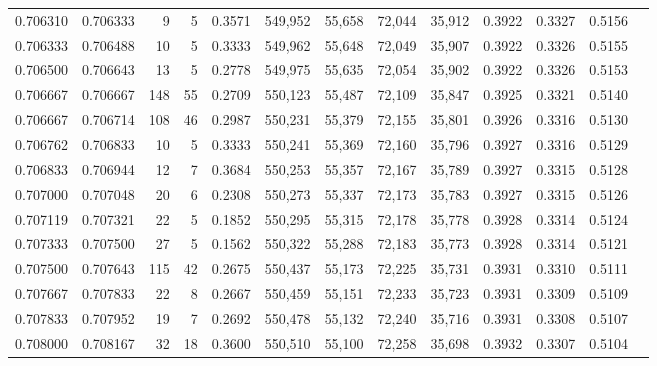 \begin{tabular}{rrrrrrrrrrrrr}
0.706310 & 0.706333 &     9 &   5 &                                     0.3571 & 549,952 &  55,658 &  72,044 &  35,912 & 0.3922 & 0.3327 & 0.5156 \\
0.706333 & 0.706488 &    10 &   5 &                                     0.3333 & 549,962 &  55,648 &  72,049 &  35,907 & 0.3922 & 0.3326 & 0.5155 \\
0.706500 & 0.706643 &    13 &   5 &                                     0.2778 & 549,975 &  55,635 &  72,054 &  35,902 & 0.3922 & 0.3326 & 0.5153 \\
0.706667 & 0.706667 &   148 &  55 &                                     0.2709 & 550,123 &  55,487 &  72,109 &  35,847 & 0.3925 & 0.3321 & 0.5140 \\
0.706667 & 0.706714 &   108 &  46 &                                     0.2987 & 550,231 &  55,379 &  72,155 &  35,801 & 0.3926 & 0.3316 & 0.5130 \\
0.706762 & 0.706833 &    10 &   5 &                                     0.3333 & 550,241 &  55,369 &  72,160 &  35,796 & 0.3927 & 0.3316 & 0.5129 \\
0.706833 & 0.706944 &    12 &   7 &                                     0.3684 & 550,253 &  55,357 &  72,167 &  35,789 & 0.3927 & 0.3315 & 0.5128 \\
0.707000 & 0.707048 &    20 &   6 &                                     0.2308 & 550,273 &  55,337 &  72,173 &  35,783 & 0.3927 & 0.3315 & 0.5126 \\
0.707119 & 0.707321 &    22 &   5 &                                     0.1852 & 550,295 &  55,315 &  72,178 &  35,778 & 0.3928 & 0.3314 & 0.5124 \\
0.707333 & 0.707500 &    27 &   5 &                                     0.1562 & 550,322 &  55,288 &  72,183 &  35,773 & 0.3928 & 0.3314 & 0.5121 \\
0.707500 & 0.707643 &   115 &  42 &                                     0.2675 & 550,437 &  55,173 &  72,225 &  35,731 & 0.3931 & 0.3310 & 0.5111 \\
0.707667 & 0.707833 &    22 &   8 &                                     0.2667 & 550,459 &  55,151 &  72,233 &  35,723 & 0.3931 & 0.3309 & 0.5109 \\
0.707833 & 0.707952 &    19 &   7 &                                     0.2692 & 550,478 &  55,132 &  72,240 &  35,716 & 0.3931 & 0.3308 & 0.5107 \\
0.708000 & 0.708167 &    32 &  18 &                                     0.3600 & 550,510 &  55,100 &  72,258 &  35,698 & 0.3932 & 0.3307 & 0.5104 \\

\end{tabular}
